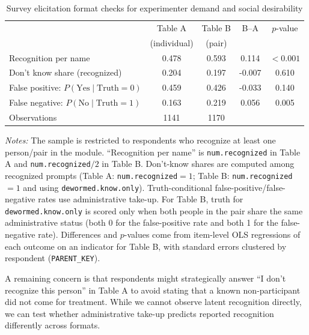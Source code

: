 \documentclass[12pt,a4paper]{article}
\begin{document}
\begin{table}[!htbp]\centering
\caption{Survey elicitation format checks for experimenter demand and social desirability}
\label{tab:demand_checks}
\begin{tabular}{lcccc}
\hline\hline
 & Table A & Table B & B--A & $p$-value\\
  & (individual) & (pair) &  & \\
\hline
Recognition per name & 0.478 & 0.593 & 0.114 & $<0.001$\\
Don’t know share (recognized) & 0.204 & 0.197 & -0.007 & 0.610\\
False positive: $P(\text{Yes}\mid\text{Truth}=0)$ & 0.459 & 0.426 & -0.033 & 0.140\\
False negative: $P(\text{No}\mid\text{Truth}=1)$ & 0.163 & 0.219 & 0.056 & 0.005\\
\hline
Observations & 1141 & 1170 & & \\
\hline\hline
\end{tabular}
\begin{minipage}{0.95\textwidth}\footnotesize
\textit{Notes:} The sample is restricted to respondents who recognize at least one person/pair in the module. ``Recognition per name'' is \texttt{num.recognized} in Table A and \texttt{num.recognized}$/2$ in Table B. Don’t-know shares are computed among recognized prompts (Table A: \texttt{num.recognized}$=1$; Table B: \texttt{num.recognized}$=1$ and using \texttt{dewormed.know.only}). Truth-conditional false-positive/false-negative rates use administrative take-up. For Table B, truth for \texttt{dewormed.know.only} is scored only when both people in the pair share the same administrative status (both 0 for the false-positive rate and both 1 for the false-negative rate). Differences and $p$-values come from item-level OLS regressions of each outcome on an indicator for Table B, with standard errors clustered by respondent (\texttt{PARENT_KEY}).
\end{minipage}
\end{table}


A remaining concern is that respondents might strategically answer ``I don't recognize this person'' in Table A to avoid stating that a known non-participant did not come for treatment. While we cannot observe latent recognition directly, we can test whether administrative take-up predicts reported recognition differently across formats.
\end{document}
